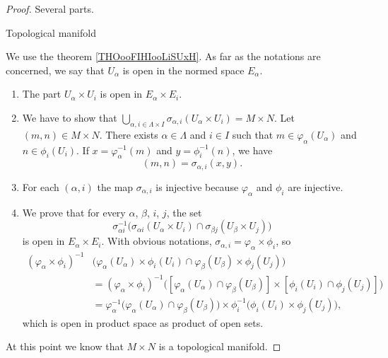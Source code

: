 \begin{proof}
	Several parts.
	\begin{proofpart}
		Topological manifold
	\end{proofpart}
	We use the theorem \ref{THOooFIHIooLiSUxH}. As far as the notations are concerned, we say that \( U_{\alpha}\) is open in the normed space \( E_{\alpha}\).
	\begin{enumerate}
		\item
		      The part \( U_{\alpha}\times U_i\) is open in \( E_{\alpha}\times E_i\).
		\item
		      We have to show that \( \bigcup_{\alpha,i\in \Lambda\times I}\sigma_{\alpha,i}(U_{\alpha}\times U_i)=M\times N\). Let \( (m,n)\in M\times N\). There exists \( \alpha\in \Lambda\) and \( i\in I\) such that \( m\in \varphi_{\alpha}(U_{\alpha}) \) and \( n\in \phi_i(U_i)\). If \( x=\varphi_{\alpha}^{-1}(m)\) and \( y=\phi^{-1}_i(n)\), we have
		      \begin{equation}
			      (m,n)=\sigma_{\alpha,i}(x,y).
		      \end{equation}
		\item
		      For each \( (\alpha,i)\) the map \( \sigma_{\alpha,i}\) is injective because \( \varphi_{\alpha}\) and \( \phi_i\) are injective.
		\item
		      We prove that for every \( \alpha\), \( \beta\), \( i\), \( j\), the set
		      \begin{equation}
			      \sigma_{\alpha i}^{-1}\big( \sigma_{\alpha i}(U_{\alpha}\times U_i)\cap \sigma_{\beta j}(U_{\beta}\times U_j) \big)
		      \end{equation}
		      is open in \( E_{\alpha}\times E_i\). With obvious notations, \( \sigma_{\alpha,i}=\varphi_{\alpha}\times \phi_i\), so
		      \begin{subequations}
			      \begin{align}
				      (\varphi_{\alpha}\times \phi_i)^{-1} & \Big( \varphi_{\alpha}(U_{\alpha})\times \phi_i(U_i)\cap \varphi_{\beta}(U_{\beta})\times \phi_j(U_j) \Big)                                               \\
				                                           & = (\varphi_{\alpha}\times \phi_i)^{-1}\Big( [\varphi_{\alpha}(U_{\alpha})\cap \varphi_{\beta}(U_{\beta})]\times [\phi_i(U_i)\cap \phi_j(U_j)] \Big)       \\
				                                           & = \varphi_{\alpha}^{-1}\Big( \varphi_{\alpha}(U_{\alpha})\cap\varphi_{\beta}(U_{\beta}) \Big)\times \phi_i^{-1}\Big( \phi_i(U_i)\times \phi_j(U_j) \Big),
			      \end{align}
		      \end{subequations}
		      which is open in product space as product of open sets.
	\end{enumerate}
	At this point we know that \( M\times N\) is a topological manifold.


\end{proof}
